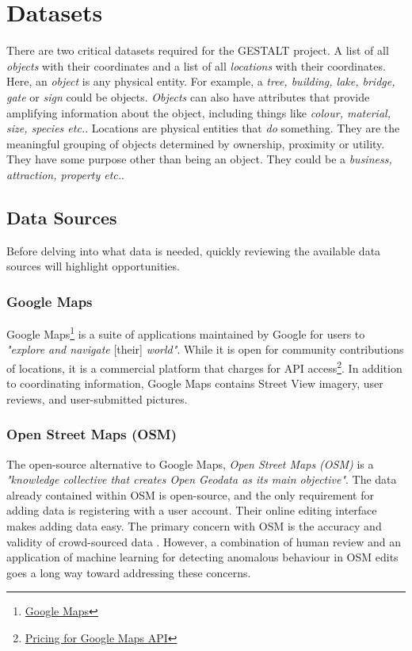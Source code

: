 \section{Datasets}
\label{section:datasets}

There are two critical datasets required for the GESTALT project. A list of all \textit{objects} with their coordinates and a list of all \textit{locations} with their coordinates. 
Here, an \textit{object} is any physical entity. For example, a \textit{tree, building, lake, bridge, gate} or \textit{sign} could be objects.
\textit{Objects} can also have attributes that provide amplifying information about the object, including things like \textit{colour, material, size, species etc.}. 
Locations are physical entities that \textit{do} something. They are the meaningful grouping of objects determined by ownership, proximity or utility. They have some purpose other than being an object. They could be a \textit{business, attraction, property etc.}. 

\subsection{Data Sources}
Before delving into what data is needed, quickly reviewing the available data sources will highlight opportunities. 

\subsubsection{Google Maps}
Google Maps\footnote{\href{https://www.google.com/maps/about/}{Google Maps}} is a suite of applications maintained by Google for users to \textit{"explore and navigate} [their] \textit{world"}. 
While it is open for community contributions of locations, it is a commercial platform that charges for API access\footnote{\href{https://mapsplatform.google.com/pricing/}{Pricing for Google Maps API}}. 
In addition to coordinating information, Google Maps contains Street View imagery, user reviews, and user-submitted pictures. 

\subsubsection{Open Street Maps (OSM)}
The open-source alternative to Google Maps, \textit{Open Street Maps (OSM)} is a \textit{"knowledge collective that creates Open Geodata as its main objective"}\cite{Haklay2008}. 
The data already contained within OSM is open-source, and the only requirement for adding data is registering with a user account. Their online editing interface makes adding data easy. 
The primary concern with OSM is the accuracy and validity of crowd-sourced data \cite{VargasMunoz2020}. However, a combination of human review and an application of machine learning for detecting anomalous behaviour in OSM edits \cite{Mooney2017} goes a long way toward addressing these concerns.  

